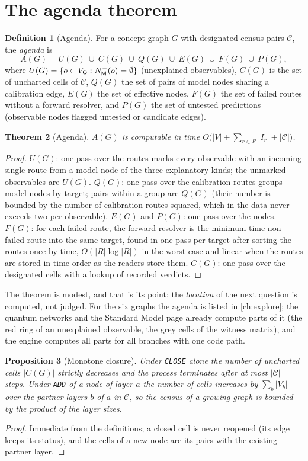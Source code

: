 \documentclass[11pt,a4paper,twoside,openany]{report}
\theoremstyle{plain}
\newtheorem{theorem}{Theorem}[chapter]
\newtheorem{proposition}[theorem]{Proposition}
\theoremstyle{definition}
\newtheorem{definition}[theorem]{Definition}
\theoremstyle{remark}
\newcommand{\lay}[1]{\mathsf{#1}}
\newcommand{\op}[1]{\texttt{\MakeUppercase{#1}}}
\begin{document}
\section{The agenda theorem}
\begin{definition}[Agenda]
For a concept graph $G$ with designated census pairs $\mathcal C$, the \emph{agenda} is
\[A(G)=U(G)\ \cup\ C(G)\ \cup\ Q(G)\ \cup\ E(G)\ \cup\ F(G)\ \cup\ P(G),\]
where $U(G)=\{o\in\VO: N^-_{\lay M}(o)=\emptyset\}$ (unexplained observables), $C(G)$ is the set of uncharted cells of $\mathcal C$, $Q(G)$ the set of pairs of model nodes sharing a calibration edge, $E(G)$ the set of effective nodes, $F(G)$ the set of failed routes without a forward resolver, and $P(G)$ the set of untested predictions (observable nodes flagged untested or candidate edges).
\end{definition}
\begin{theorem}[Agenda]\label{thm:agenda}
$A(G)$ is computable in time $O\big(|V|+\sum_{r\in R}|I_r|+|\mathcal C|\big)$.
\end{theorem}
\begin{proof}
$U(G)$: one pass over the routes marks every observable with an incoming single route from a model node of the three explanatory kinds; the unmarked observables are $U(G)$. $Q(G)$: one pass over the calibration routes groups model nodes by target; pairs within a group are $Q(G)$ (their number is bounded by the number of calibration routes squared, which in the data never exceeds two per observable). $E(G)$ and $P(G)$: one pass over the nodes. $F(G)$: for each failed route, the forward resolver is the minimum-time non-failed route into the same target, found in one pass per target after sorting the routes once by time, $O(|R|\log|R|)$ in the worst case and linear when the routes are stored in time order as the readers store them. $C(G)$: one pass over the designated cells with a lookup of recorded verdicts.
\end{proof}
The theorem is modest, and that is its point: the \emph{location} of the next question is computed, not judged. For the six graphs the agenda is listed in \cref{ch:explore}; the quantum networks and the Standard Model page already compute parts of it (the red ring of an unexplained observable, the grey cells of the witness matrix), and the engine computes all parts for all branches with one code path.

\begin{proposition}[Monotone closure]\label{prop:closure}
Under \op{close} alone the number of uncharted cells $|C(G)|$ strictly decreases and the process terminates after at most $|\mathcal C|$ steps. Under \op{add} of a node of layer $a$ the number of cells increases by $\sum_{b}|V_b|$ over the partner layers $b$ of $a$ in $\mathcal C$, so the census of a growing graph is bounded by the product of the layer sizes.
\end{proposition}
\begin{proof}
Immediate from the definitions; a closed cell is never reopened (its edge keeps its status), and the cells of a new node are its pairs with the existing partner layer.
\end{proof}
\end{document}
